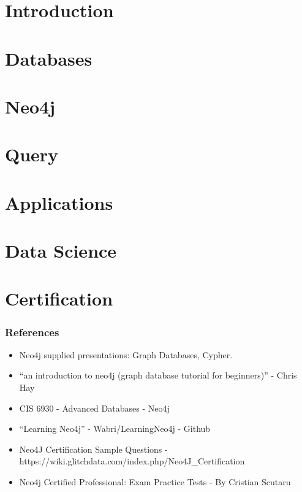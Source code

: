 \section[Intro]{Introduction}



\section[Db]{Databases}


\section[Neo4j]{Neo4j}


\section[Query]{Query}


\section[Apps]{Applications}


\section[DS]{Data Science}



\section[Cert]{Certification}


\begin{frame}\frametitle{References}
\begin{itemize}
\item Neo4j supplied presentations: Graph Databases, Cypher.
\item ``an introduction to neo4j (graph database tutorial for beginners)'' - Chris Hay
\item CIS 6930 - Advanced Databases - Neo4j 
\item ``Learning Neo4j'' - Wabri/LearningNeo4j - Github
\item Neo4J Certification Sample Questions - https://wiki.glitchdata.com/index.php/Neo4J\_Certification
\item Neo4j Certified Professional: Exam Practice Tests - By Cristian Scutaru
\end{itemize}
\end{frame}